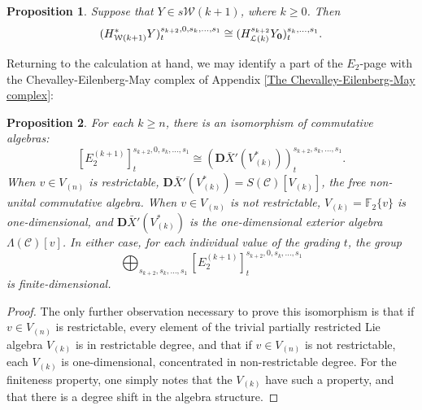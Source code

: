 \documentclass[11pt]{amsart} \renewcommand{\baselinestretch}{1.2}
\theoremstyle{plain}
\newtheorem{thm}{Theorem}[section] %
\newtheorem{prop}[thm]{Proposition}
\numberwithin{equation}{section} %
\theoremstyle{plain}
\newtheorem{thm}{Theorem}[chapter] %
\newtheorem{prop}[thm]{Proposition}
\numberwithin{equation}{chapter} %
\renewcommand{\to}{\longrightarrow}
\newcommand{\scrC}{\mathscr{C}}
\newcommand{\calL}{\mathcal{L}}
\newcommand{\calw}{\mathcal{W}}
\newcommand{\calMv}{\mathcal{M}\dver}
\newcommand{\calMh}{\mathcal{M}\dhor}
\newcommand{\CommOperad}{{\scrC}}
\newcommand{\UEAX}{\bar{X}'}%
\newcommand{\F}{\mathbb{F}}
\newcommand{\Ftwo}{\F_2}
\newcommand{\E}[5]{[E^{#1}_{#2}#3]^{#4}_{#5}}
\newcommand{\dver}{_\mathrm{v}}
\newcommand{\dhor}{_\mathrm{h}}
\newcommand{\dual}{\mathbf{D}}
\begin{document}
\begin{Calculations of HWn}
\begin{prop}
Suppose that $Y\in s\calw(k+1)$, where $k\geq0$. Then
\[(H^*_{\calw(k+1)}Y)^{s_{k+2},0,s_k,\ldots,s_1}_{t}\cong (H^{s_{k+2}}_{\calL(k)}Y_\textup{\textbf{0}})^{s_k,\ldots,s_1}_t.\]
\end{prop}
Returning to the calculation at hand, we may identify a part of the $E_2$-page with the Chevalley-Eilenberg-May complex of Appendix \ref{The Chevalley-Eilenberg-May complex}:
\begin{prop}
\label{calculation in internal dimension zero}
For each $k\geq n$, there is an isomorphism of commutative algebras:
\[\E{(k+1)}{2}{}{s_{k+2},0,s_k,\ldots,s_1}{t} \cong(\dual\UEAX(V^*_{(k)}))^{s_{k+2},s_k,\ldots,s_1}_t.\]
When $v\in V_{(n)}$ is restrictable,  $\dual\UEAX(V^*_{(k)})=S(\CommOperad)[V_{(k)}]$, the free non-unital commutative algebra. When $v\in V_{(n)}$ is not restrictable, $V_{(k)}=\Ftwo\{v\}$ is one-dimensional, and $\dual\UEAX(V^*_{(k)})$ is the one-dimensional exterior algebra $\Lambda(\CommOperad)[v]$. In either case, for each individual value of the grading $t$, the group \[\bigoplus_{s_{k+2},s_k,\ldots,s_1}\E{(k+1)}{2}{}{s_{k+2},0,s_k,\ldots,s_1}{t}\] is finite-dimensional.
\end{prop}
\begin{proof}
The only further observation necessary to prove this isomorphism is that if $v\in V_{(n)}$ is restrictable, every element of the trivial partially restricted Lie algebra $V_{(k)}$ is in restrictable degree, and that if $v\in V_{(n)}$ is not restrictable, each $V_{(k)}$ is one-dimensional, concentrated in non-restrictable degree. For the finiteness property, one simply notes that the $V_{(k)}$ have such a property, and that there is a degree shift in the algebra structure.
\end{proof}


\end{Calculations of HWn}
\end{document}
